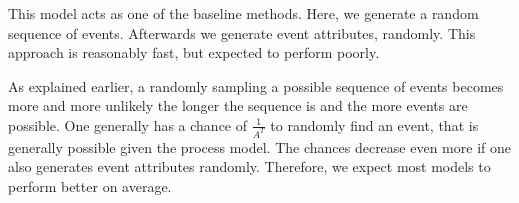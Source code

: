 \documentclass[./../../paper.tex]{subfiles}
\begin{document}
This model acts as one of the baseline methods. Here, we generate a random sequence of events. Afterwards we generate event attributes, randomly. This approach is reasonably fast, but expected to perform poorly.

As explained earlier, a randomly sampling a possible sequence of events becomes more and more unlikely the longer the sequence is and the more events are possible. One generally has a chance of $\frac{1}{A^T}$ to randomly find an event, that is generally possible given the process model. The chances decrease even more if one also generates event attributes randomly. Therefore, we expect most models to perform better on average.
\end{document}
